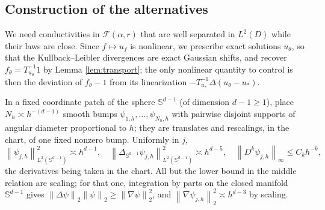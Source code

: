 \documentclass[11pt]{article}
\numberwithin{equation}{section}
\newcommand{\norm}[1]{\left\|#1\right\|}
\newcommand{\Sp}{\mathbb S^{d-1}}
\begin{document}
\subsection{Construction of the alternatives}

We need conductivities in $\mathcal F(\alpha,r)$ that are well
separated in $L^2(D)$ while their laws are close. Since
$f\mapsto u_f$ is nonlinear, we prescribe exact solutions $u_\theta$,
so that the Kullback--Leibler divergences are exact Gaussian shifts,
and recover $f_\theta=T_{u_\theta}^{-1}1$ by Lemma
\ref{lem:transport}; the only nonlinear quantity to control is then
the deviation of $f_\theta-1$ from its linearization
$-T_{u_*}^{-1}\Delta(u_\theta-u_*)$.

In a fixed coordinate patch of the sphere $\Sp$ (of dimension
$d-1\ge1$), place $N_h\asymp h^{-(d-1)}$ smooth bumps
$\psi_{1,h},\ldots,\psi_{N_h,h}$ with pairwise disjoint supports of
angular diameter proportional to $h$; they are translates and
rescalings, in the chart, of one fixed nonzero bump. Uniformly in $j$,
\begin{equation}\label{eq:angularbumps}
 \norm{\psi_{j,h}}_{L^2(\Sp)}^2\asymp h^{d-1},\quad
 \norm{\Delta_{\Sp}\psi_{j,h}}_{L^2(\Sp)}^2\asymp h^{d-5},
 \quad \norm{D^k\psi_{j,h}}_\infty\le C_kh^{-k},
\end{equation}
the derivatives being taken in the chart. All but the lower bound in
the middle relation are scaling; for that
one, integration by parts on the closed manifold $\Sp$ gives
$\norm{\Delta\psi}_2\norm\psi_2\ge\norm{\nabla\psi}_2^2$, and
$\norm{\nabla\psi_{j,h}}_2^2\asymp h^{d-3}$ by scaling.
\end{document}
